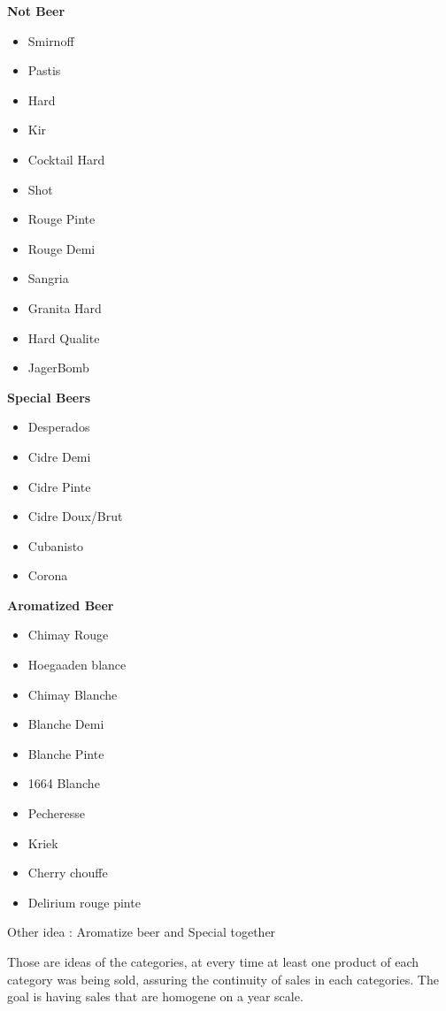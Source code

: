 \documentclass{report}
\begin{document}
\begin{multicols}{3}

\textbf{Not Beer}
\begin{itemize}
\item Smirnoff
\item Pastis
\item Hard
\item Kir
\item Cocktail Hard
\item Shot
\item Rouge Pinte 
\item Rouge Demi
\item Sangria
\item Granita Hard
\item Hard Qualite
\item JagerBomb
\end{itemize}

\columnbreak

\textbf{Special Beers}
\begin{itemize}
\item Desperados
\item Cidre Demi
\item Cidre Pinte
\item Cidre Doux/Brut
\item Cubanisto
\item Corona
\end{itemize}

\columnbreak

\textbf{Aromatized Beer}
\begin{itemize}
\item Chimay Rouge
\item Hoegaaden blance
\item Chimay Blanche
\item Blanche Demi
\item Blanche Pinte
\item 1664 Blanche
\item Pecheresse
\item Kriek
\item Cherry chouffe
\item Delirium rouge pinte
\end{itemize}

\end{multicols}


Other idea : Aromatize beer and Special together

Those are ideas of the categories, at every time at least one product of each category was being sold, assuring the continuity of sales in each categories. The goal is having sales that are homogene on a year scale.
\end{document}
